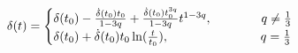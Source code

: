 \begin{equation}\label{deltaresult}
\delta(t)=
\begin{cases}
\delta(t_0)-\frac{\dot{\delta}(t_0)t_0}{1-3q}+\frac{\dot{\delta}(t_0)t_0^{3q}}{1-3q}t^{1-3q},
\hspace{1.4cm} q\neq \frac{1}{3} \\
\delta(t_0)+\dot{\delta}(t_0)t_0\ln(\frac{t}{t_0}), \hspace{2.6cm}
q=\frac{1}{3}
\end{cases}
\end{equation}

